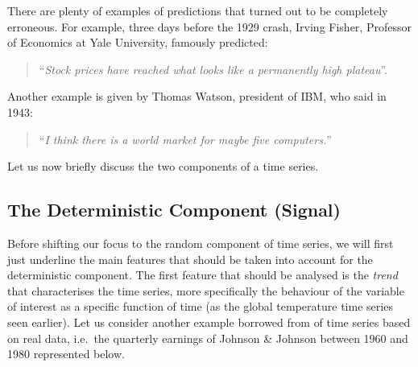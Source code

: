 \documentclass[]{book}
\newenvironment{Shaded}{\begin{snugshade}}{\end{snugshade}}
\newcommand{\KeywordTok}[1]{\textcolor[rgb]{0.13,0.29,0.53}{\textbf{#1}}}
\newcommand{\DataTypeTok}[1]{\textcolor[rgb]{0.13,0.29,0.53}{#1}}
\newcommand{\DecValTok}[1]{\textcolor[rgb]{0.00,0.00,0.81}{#1}}
\newcommand{\StringTok}[1]{\textcolor[rgb]{0.31,0.60,0.02}{#1}}
\newcommand{\CommentTok}[1]{\textcolor[rgb]{0.56,0.35,0.01}{\textit{#1}}}
\newcommand{\NormalTok}[1]{#1}
\theoremstyle{definition}
\theoremstyle{definition}
\theoremstyle{definition}
\theoremstyle{remark}
\begin{document}
There are plenty of examples of predictions that turned out to be
completely erroneous. For example, three days before the 1929 crash,
Irving Fisher, Professor of Economics at Yale University, famously
predicted:

\begin{quote}
``\emph{Stock prices have reached what looks like a permanently high
plateau}''.
\end{quote}

Another example is given by Thomas Watson, president of IBM, who said in
1943:

\begin{quote}
``\emph{I think there is a world market for maybe five computers.}''
\end{quote}

Let us now briefly discuss the two components of a time series.

\subsection{The Deterministic Component
(Signal)}\label{the-deterministic-component-signal}

Before shifting our focus to the random component of time series, we
will first just underline the main features that should be taken into
account for the deterministic component. The first feature that should
be analysed is the \emph{trend} that characterises the time series, more
specifically the behaviour of the variable of interest as a specific
function of time (as the global temperature time series seen earlier).
Let us consider another example borrowed from \citet{shumway2010time} of
time series based on real data, i.e.~the quarterly earnings of Johnson
\& Johnson between 1960 and 1980 represented below.

\begin{Shaded}
\end{Shaded}
\end{document}
